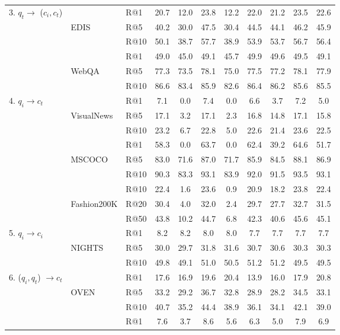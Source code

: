 \begin{table}[]
{\begin{tabular}{lll|cccc|cccc}
 \midrule
\multirow{6}{*}{3. $q_t 	\to$ ($c_i, c_t$)} &  & R@1 & 20.7 & 12.0 & 23.8 & 12.2 & 22.0 & 21.2 & 23.5 & 22.6\\
 & EDIS & R@5 & 40.2 & 30.0 & 47.5 & 30.4 & 44.5 & 44.1 & 46.2 & 45.9\\
 &  & R@10 & 50.1 & 38.7 & 57.7 & 38.9 & 53.9 & 53.7 & 56.7 & 56.4\\
 \cmidrule{2-11}
 &  & R@1 & 49.0 & 45.0 & 49.1 & 45.7 & 49.9 & 49.6 & 49.5 & 49.1\\
 & WebQA & R@5 & 77.3 & 73.5 & 78.1 & 75.0 & 77.5 & 77.2 & 78.1 & 77.9\\
 &  & R@10 & 86.6 & 83.4 & 85.9 & 82.6 & 86.4 & 86.2 & 85.6 & 85.5\\
 \midrule
\multirow{9}{*}{4. $q_i 	\to c_t$} &  & R@1 & 7.1 & 0.0 & 7.4 & 0.0 & 6.6 & 3.7 & 7.2 & 5.0\\
 & VisualNews & R@5 & 17.1 & 3.2 & 17.1 & 2.3 & 16.8 & 14.8 & 17.1 & 15.8\\
 &  & R@10 & 23.2 & 6.7 & 22.8 & 5.0 & 22.6 & 21.4 & 23.6 & 22.5\\
 \cmidrule{2-11}
 &  & R@1 & 58.3 & 0.0 & 63.7 & 0.0 & 62.4 & 39.2 & 64.6 & 51.7\\
 & MSCOCO & R@5 & 83.0 & 71.6 & 87.0 & 71.7 & 85.9 & 84.5 & 88.1 & 86.9\\
 &  & R@10 & 90.3 & 83.3 & 93.1 & 83.9 & 92.0 & 91.5 & 93.5 & 93.1\\
 \cmidrule{2-11}
 &  & R@10 & 22.4 & 1.6 & 23.6 & 0.9 & 20.9 & 18.2 & 23.8 & 22.4\\
 & Fashion200K & R@20 & 30.4 & 4.0 & 32.0 & 2.4 & 29.7 & 27.7 & 32.7 & 31.5\\
 &  & R@50 & 43.8 & 10.2 & 44.7 & 6.8 & 42.3 & 40.6 & 45.6 & 45.1\\
 \midrule
\multirow{3}{*}{5. $q_i 	\to c_i$} &  & R@1 & 8.2 & 8.2 & 8.0 & 8.0 & 7.7 & 7.7 & 7.7 & 7.7\\
 & NIGHTS & R@5 & 30.0 & 29.7 & 31.8 & 31.6 & 30.7 & 30.6 & 30.3 & 30.3\\
 &  & R@10 & 49.8 & 49.1 & 51.0 & 50.5 & 51.2 & 51.2 & 49.5 & 49.5\\
 \midrule
\multirow{6}{*}{6. ($q_i, q_t$) $	\to c_t$} &  & R@1 & 17.6 & 16.9 & 19.6 & 20.4 & 13.9 & 16.0 & 17.9 & 20.8\\
 & OVEN & R@5 & 33.2 & 29.2 & 36.7 & 32.8 & 28.9 & 28.2 & 34.5 & 33.1\\
 &  & R@10 & 40.7 & 35.2 & 44.4 & 38.9 & 36.1 & 34.1 & 42.1 & 39.0\\
 \cmidrule{2-11}
 &  & R@1 & 7.6 & 3.7 & 8.6 & 5.6 & 6.3 & 5.0 & 7.9 & 6.9\\

\end{tabular}}
\end{table}
